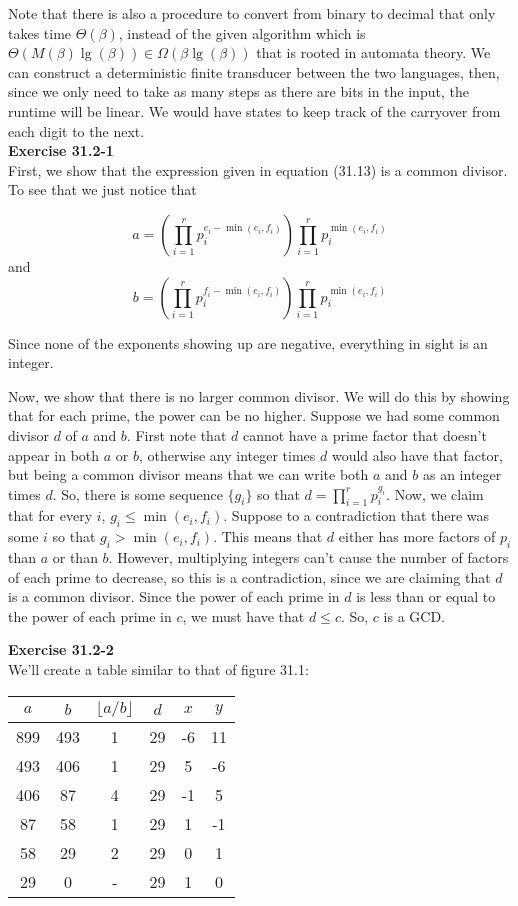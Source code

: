 \documentclass{article}
\begin{document}
Note that there is also a procedure to convert from binary to decimal that only takes time $\Theta(\beta)$, instead of the given algorithm which is $\Theta(M(\beta)\lg(\beta)) \in \Omega(\beta \lg(\beta))$ that is rooted in automata theory. We can construct a deterministic finite transducer between the two languages, then, since we only need to take as many steps as there are bits in the input, the runtime will be linear. We would have states to keep track of the carryover from each digit to the next.\\

\noindent\textbf{Exercise 31.2-1}\\

First, we show that the expression given in equation (31.13) is a common divisor. To see that we just notice that 

\[
a = (\prod_{i=1}^r p_i^{e_i-\min(e_i,f_i)})\prod_{i=1}^r p_i^{\min(e_i,f_i)}
\]
and 
\[
b = (\prod_{i=1}^r p_i^{f_i-\min(e_i,f_i)})\prod_{i=1}^r p_i^{\min(e_i,f_i)}
\]

Since none of the exponents showing up are negative, everything in sight is an integer.

Now, we show that there is no larger common divisor. We will do this by showing that for each prime, the power can be no higher. Suppose we had some common divisor $d$ of $a$ and $b$. First note that $d$ cannot have a prime factor that doesn't appear in both $a$ or $b$, otherwise any integer times $d$ would also have that factor, but being a common divisor means that we can write both $a$ and $b$ as an integer times $d$. So, there is some sequence $\{g_i\}$ so that $d = \prod_{i=1}^r p_i^{g_i}$. Now, we claim that for every $i$, $g_i \le \min(e_i,f_i)$. Suppose to a contradiction that there was some $i$ so that $g_i>\min(e_i,f_i)$. This means that $d$ either has more factors of $p_i$ than $a$ or than $b$. However, multiplying integers can't cause the number of factors of each prime to decrease, so this is a contradiction, since we are claiming that $d$ is a common divisor. Since the power of each prime in $d$ is less than or equal to the power of each prime in $c$, we must have that $d\le c$. So, $c$ is a GCD.

\noindent\textbf{Exercise 31.2-2}\\

We'll create a table similar to that of figure 31.1:

\begin{tabular}{cccccc} 
$a$ & $b$ & $\lfloor a/b \rfloor$ & $d$ & $x$ & $y$ \\ \hline
899 & 493 & 1 & 29 & -6 & 11 \\
493 & 406 & 1 & 29 & 5 & -6 \\
406 & 87 & 4 & 29 & -1 & 5 \\
87 & 58 & 1 & 29 & 1 & -1 \\
58 & 29 & 2 & 29 & 0 & 1\\
29 & 0 & - & 29 & 1 & 0
\end{tabular}
\end{document}
